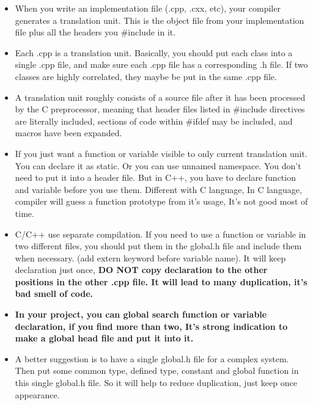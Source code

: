 \documentclass[a4paper,12pt,twoside]{book}
\begin{document}
\begin{itemize}

\item When you write an implementation file (.cpp, .cxx, etc),  your compiler generates a translation unit. This is the object file from your implementation file plus all the headers you \#include in it.

\item Each .cpp is a translation unit. Basically, you should put each class into a single .cpp file, and make sure each .cpp file has a corresponding .h file.  If two classes are highly correlated, they maybe be put in the same .cpp file.

\item A translation unit roughly consists of a source file after it has been processed by the C preprocessor, meaning that header files listed in \#include directives are literally included, sections of code within \#ifdef may be included, and macros have been expanded.

\item If you just want a function or variable visible to only current translation unit. You can declare it as static. Or you can use unnamed namespace.  You don't need to put it into a header file.  But in C++, you have to declare function and variable before you use them. Different with C language, In C language, compiler will guess a function prototype from it's usage, It's not good most of time.

\item C/C++ use separate compilation. If you need to use a function or variable in two different files, you should put them in the  global.h file and include them when necessary. (add extern keyword before variable name).  It will keep declaration just once, \textbf{DO NOT copy declaration to the other positions in the other .cpp file. It will lead to many duplication, it's bad smell of code.}

\item \textbf{In your project, you can global search function or variable declaration, if you find more than two, It's strong indication to make a global head file and put it into it.}

\item A better suggestion is to have a single global.h file for a complex system. Then put some common type, defined type, constant and global function in this single global.h file. So it will help to reduce duplication, just keep once appearance.


\end{itemize}
\end{document}

